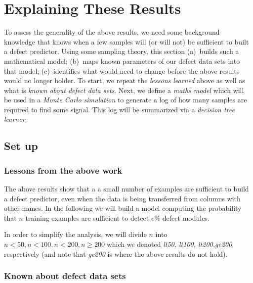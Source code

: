 



\newcommand{\tion}[1]{\S\ref{sect:#1}}
\newcommand{\fig}[1]{Figure~\ref{fig:#1}}
\newcommand{\eq}[1]{Equation~\ref{eq:#1}}
\newcommand{\bi}{\begin{itemize}}
\newcommand{\ei}{\end{itemize}}

\section{Explaining These Results}
To assess the generality of the above results, we need some background knowledge that knows when a few samples will (or will not)
be sufficient to built a defect predictor. Using some sampling theory, this section (a)~builds such a mathematical model; (b)~maps known parameters
of our defect data sets into that model; (c)~identifies what would need to change before the above results would no longer holder.
To start, we repeat the {\em lessons learned} above as well as what is {\em known about defect data sets}.
Next, we define a {\em maths model} which will be used in a {\em Monte Carlo simulation} to generate a log of how many samples are required
to find some signal. This log will be summarized via a {\em decision tree learner}.

\subsection{Set up}
\subsubsection{ Lessons from the above work}

The above results show
that a  
a small number
of examples are sufficient to build a defect predictor, even when the data is being transferred from columns with other names.
In the following we will build a model computing the probability that $n$ training examples are sufficient to detect $e$\% defect modules.

In order to simplify the analysis, we will divide $n$ into
  $n<50, n<100, n<200,n\ge200$ which we denoted {\em lt50, lt100, lt200,ge200}, respectively (and note that {\em ge200} is where the above
  results do not hold).

\subsubsection{Known about defect data sets}\label{sect:data}

